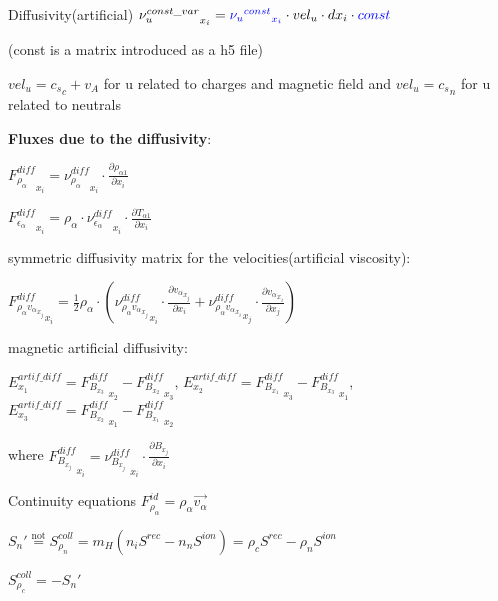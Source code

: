 \documentclass{beamer}
\begin{document}
\begin{frame}{Diffusivity(artificial)}
${\nu_u^{const\_var}}_{x_i}  = \textcolor{blue}{{{\nu_u}^{const}}_{x_i}} \cdot  vel_u \cdot  dx_i \cdot  \textcolor{blue}{const}$ 

(const is a matrix introduced as a h5 file)

$vel_u =  {c_s}_c + v_A$ for u  related to charges and magnetic field and 
$vel_u =  {c_s}_n $ for u  related to neutrals

\textbf{Fluxes due to the diffusivity}:

${F_{\rho_\alpha}^{diff}}_{x_i} =  {\nu_{\rho_\alpha}^{diff}}_{x_i} \cdot \frac{\partial \rho_{\alpha1}}{\partial x_i}$

${F_{\epsilon_\alpha}^{diff}}_{x_i} =  \rho_\alpha \cdot {\nu_{\epsilon_\alpha}^{diff}}_{x_i} \cdot \frac{\partial T_{\alpha1}}{\partial x_i}$


symmetric diffusivity matrix for the velocities(artificial viscosity):

${F_{\rho_\alpha{v_\alpha}_{x_j}}^{diff}}_{x_i}  = \frac{1}{2} \rho_\alpha \cdot ({\nu_{\rho_\alpha{v_\alpha}_{x_j}}^{diff}}_{x_i} \cdot \frac{\partial {v_\alpha}_{x_j}}{\partial x_i} +  {\nu_{\rho_\alpha{v_\alpha}_{x_i}}^{diff}}_{x_j} \cdot \frac{\partial {v_\alpha}_{x_i}}{\partial x_j} )$

magnetic artificial diffusivity:

$E^{artif\_diff}_{x_1} = {F_{B_{x_3}}^{diff}}_{x_2} - {F_{B_{x_2}}^{diff}}_{x_3}   $,  
$E^{artif\_diff}_{x_2} = {F_{B_{x_1}}^{diff}}_{x_3} - {F_{B_{x_3}}^{diff}}_{x_1}   $,  
$E^{artif\_diff}_{x_3} = {F_{B_{x_2}}^{diff}}_{x_1} - {F_{B_{x_1}}^{diff}}_{x_2}   $  

where 
${F_{B_{x_j}}^{diff}}_{x_i} =  {\nu_{B_{x_j}}^{diff}}_{x_i} \cdot \frac{\partial B_{x_j}}{\partial x_i}$

\end{frame}
\begin{frame}{Continuity equations}
$F_{\rho_{\alpha}}^{id} = \rho_\alpha \vec{v_\alpha} $

$S_n' \stackrel{\text{not}}{=} S_{\rho_n}^{coll} = m_H (n_i S^{rec} - n_n S^{ion} ) = \rho_c S^{rec} - \rho_n S^{ion} $

$S_{\rho_c}^{coll} = -S_n'$
\end{frame}
\end{document}
